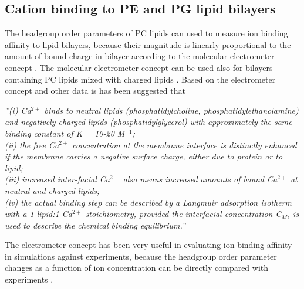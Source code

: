 \documentclass[aps,prl,superscriptaddress,twocolumn]{revtex4}
\begin{document}
\subsection{Cation binding to PE and PG lipid bilayers}
The headgroup order parameters of PC lipids can used to measure ion binding
affinity to lipid bilayers, because their magnitude is linearly proportional
to the amount of bound charge in bilayer according to the molecular
electrometer concept \cite{seelig87,catte16}. The molecular electrometer concept
can be used also for bilayers containing PC lipids mixed with charged
lipids \cite{borle85,macdonald87,roux90,NMRlipidsIVps}.
%
Based on the electrometer concept and other data is has been suggested that \cite{seelig90}
\begin{displayquote}
  {\it ''(i) Ca$^{2+}$ binds to neutral lipids (phosphatidylcholine, phosphatidylethanolamine) and negatively charged lipids
    (phosphatidylglycerol) with approximately the same binding constant of K = 10-20 M$^{-1}$; \\
    (ii) the free Ca$^{2+}$
    concentration at the membrane interface is distinctly enhanced if the membrane carries a negative surface
    charge, either due to protein or to lipid; \\
    (iii) increased inter-facial Ca$^{2+}$ also means increased amounts
    of bound Ca$^{2+}$ at neutral and charged lipids; \\
    (iv) the actual binding step can be described by a Langmuir
    adsorption isotherm with a 1 lipid:1 Ca$^{2+}$ stoichiometry, provided the interfacial concentration C$_M$, is
    used to describe the chemical binding equilibrium.''}
\end{displayquote}
The electrometer concept has been very useful in evaluating ion binding affinity in simulations
against experiments, because the headgroup order parameter changes as a function of ion concentration
can be directly compared with experiments \cite{catte16,melcr18,NMRlipidsIVps}.
\end{document}
